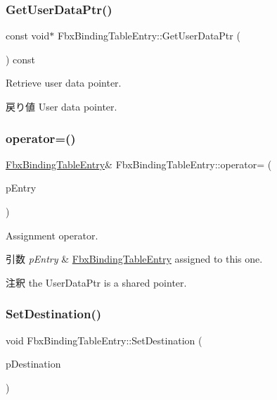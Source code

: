 \subsubsection{\texorpdfstring{Get\+User\+Data\+Ptr()}{GetUserDataPtr()}\hspace{0.1cm}{\footnotesize\ttfamily [2/2]}}
{\footnotesize\ttfamily const void$\ast$ Fbx\+Binding\+Table\+Entry\+::\+Get\+User\+Data\+Ptr (\begin{DoxyParamCaption}{ }\end{DoxyParamCaption}) const}

Retrieve user data pointer. \begin{DoxyReturn}{戻り値}
User data pointer. 
\end{DoxyReturn}
\mbox{\label{class_fbx_binding_table_entry_ae1019a3507f988ab66e09adb93326ae4}} 
\subsubsection{\texorpdfstring{operator=()}{operator=()}}
{\footnotesize\ttfamily \hyperlink{class_fbx_binding_table_entry}{Fbx\+Binding\+Table\+Entry}\& Fbx\+Binding\+Table\+Entry\+::operator= (\begin{DoxyParamCaption}\item[{const \hyperlink{class_fbx_binding_table_entry}{Fbx\+Binding\+Table\+Entry} \&}]{p\+Entry }\end{DoxyParamCaption})}

Assignment operator. 
\begin{DoxyParams}{引数}
{\em p\+Entry} & \hyperlink{class_fbx_binding_table_entry}{Fbx\+Binding\+Table\+Entry} assigned to this one. \\
\hline
\end{DoxyParams}
\begin{DoxyRemark}{注釈}
the User\+Data\+Ptr is a shared pointer. 
\end{DoxyRemark}
\mbox{\label{class_fbx_binding_table_entry_aaa49a62bd197febfb6052f3efa50eaf3}} 
\subsubsection{\texorpdfstring{Set\+Destination()}{SetDestination()}}
{\footnotesize\ttfamily void Fbx\+Binding\+Table\+Entry\+::\+Set\+Destination (\begin{DoxyParamCaption}\item[{const char $\ast$}]{p\+Destination }\end{DoxyParamCaption})}

